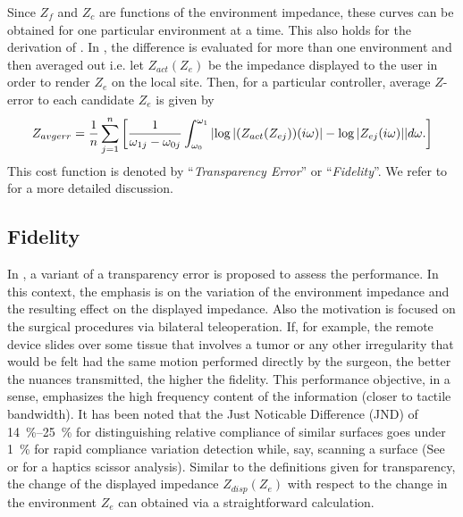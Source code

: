 Since $Z_f$ and $Z_c$ are functions of the environment impedance, these curves can be obtained for one particular environment
at a time. This also holds for the derivation of \cite{lawrence}. In \cite{goranthesis}, the difference  is evaluated for more 
than one environment and then averaged out i.e. let $Z_{act}(Z_e)$ be the impedance displayed to the user in order to render 
$Z_e$ on the local site. Then, for a particular controller, average $Z$-error to each candidate $Z_e$ is given by
\begin{equation}
Z_{avgerr} = \frac{1}{n}\sum_{j=1}^n{\left[
    \frac{1}{\omega_{1j}-\omega_{0j}}\int_{\omega_0}^{\omega_1}{%
                                     \abs{\log|(Z_{act}(Z_{ej}))(\iw)|-\log |Z_{ej}(\iw)|}}d\omega.
                                     \right]}
\label{eq:zdiff}
\end{equation}
This cost function is denoted by \enquote{\emph{Transparency Error}} or \enquote{\emph{Fidelity}}. We refer to \cite{weir} 
for a more detailed discussion. 


\subsection{Fidelity}\label{sec:perf:fidelity}
In \cite{cavusoglu}, a variant of a transparency error is proposed to assess the performance. In this context, 
the emphasis is on the variation of the environment impedance and the resulting effect on the displayed impedance. 
Also the motivation is focused on the surgical procedures via bilateral teleoperation. If, for 
example, the remote device slides over some tissue that involves a tumor or any other irregularity that would be felt
had the same motion performed directly by the surgeon, the better the nuances transmitted, the higher
the fidelity. This performance objective, in a sense, emphasizes the high frequency content of the information (closer
to tactile bandwidth). It has been noted that the Just Noticable Difference (JND) of \SIrange{14}{25}{\percent} for 
distinguishing relative compliance of similar surfaces goes under \SI{1}{\percent} for rapid compliance variation detection 
while, say, scanning a surface (See \cite{dhruvtendick} or \cite{greenishhayward} for a haptics scissor analysis). Similar to the 
definitions given for transparency, the change of the displayed impedance $Z_{disp}(Z_e)$ with respect to the change in the environment 
$Z_e$ can obtained via a straightforward calculation. 

